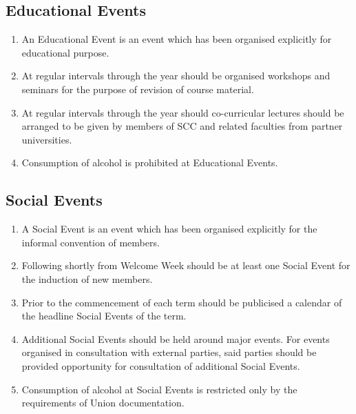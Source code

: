 \documentclass{scrartcl}
\begin{document}
        \subsection{Educational Events}
            \label{events--educational}
            \begin{enumerate}
                \item An Educational Event is an event which has been organised explicitly for educational purpose.
                \item At regular intervals through the year should be organised workshops and seminars for the purpose of revision of course material.
                \item At regular intervals through the year should co-curricular lectures should be arranged to be given by members of SCC and related faculties from partner universities.
                \item Consumption of alcohol is prohibited at Educational Events.
            \end{enumerate}

        \subsection{Social Events}
            \label{events--social}
            \begin{enumerate}
                \item A Social Event is an event which has been organised explicitly for the informal convention of members.
                \item Following shortly from Welcome Week should be at least one Social Event for the induction of new members.
                \item Prior to the commencement of each term should be publicised a calendar of the headline Social Events of the term.
                \item Additional Social Events should be held around major events.
                    \subitem For events organised in consultation with external parties, said parties should be provided opportunity for consultation of additional Social Events.
                \item Consumption of alcohol at Social Events is restricted only by the requirements of Union documentation.
            \end{enumerate}
\end{document}
